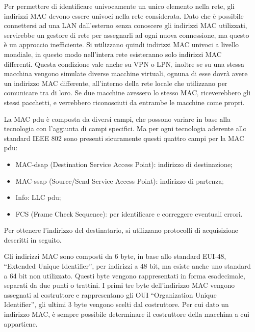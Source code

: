 \documentclass{article}
\numberwithin{equation}{subsection}
\begin{document}
Per permettere di identificare univocamente un unico elemento nella rete, gli indirizzi MAC devono essere univoci nella rete considerata. Dato che è possibile connettersi ad una LAN dall'esterno senza conoscere gli 
indirizzi MAC utilizzati, servirebbe un gestore di rete per assegnarli ad ogni nuova connessione, ma questo è un approccio inefficiente. Si utilizzano quindi indirizzi MAC univoci a livello mondiale, in questo modo 
nell'intera rete esisteranno solo indirizzi MAC differenti. Questa condizione vale anche su VPN o LPN, inoltre se su una stessa macchina vengono simulate diverse macchine virtuali, ognuna di esse dovrà avere un 
indirizzo MAC differente, all'interno della rete locale che utilizzano per comunicare tra di loro. 
Se due macchine avessero lo stesso MAC, riceverebbero gli stessi pacchetti, e verrebbero riconosciuti da entrambe le macchine come propri. 



La MAC pdu è composta da diversi campi, che possono variare in base alla tecnologia con l'aggiunta di campi specifici. Ma per ogni tecnologia aderente allo standard IEEE 802 sono presenti sicuramente questi quattro 
campi per la MAC pdu:
\begin{itemize}
  \item MAC-dsap (Destination Service Access Point): indirizzo di destinazione;
  \item MAC-ssap (Source/Send Service Access Point): indirizzo di partenza;
  \item Info: LLC pdu;
  \item FCS (Frame Check Sequence): per identificare e correggere eventuali errori.
\end{itemize}


Per ottenere l'indirizzo del destinatario, si utilizzano protocolli di acquisizione descritti in seguito. 

Gli indirizzi MAC sono composti da 6 byte, in base allo standard EUI-48, ``Extended Unique Identifier'', per indirizzi a 48 bit, ma esiste anche uno standard a 64 bit non utilizzato. Questi byte vengono rappresentati in forma esadecimale, 
separati da due punti o trattini. I primi tre byte dell'indirizzo MAC vengono assegnati al costruttore e rappresentano gli OUI ``Organization Unique Identifier'', gli ultimi 3 byte vengono scelti dal costruttore. 
Per cui dato un indirizzo MAC, è sempre possibile determinare il costruttore della macchina a cui appartiene. 
\end{document}
